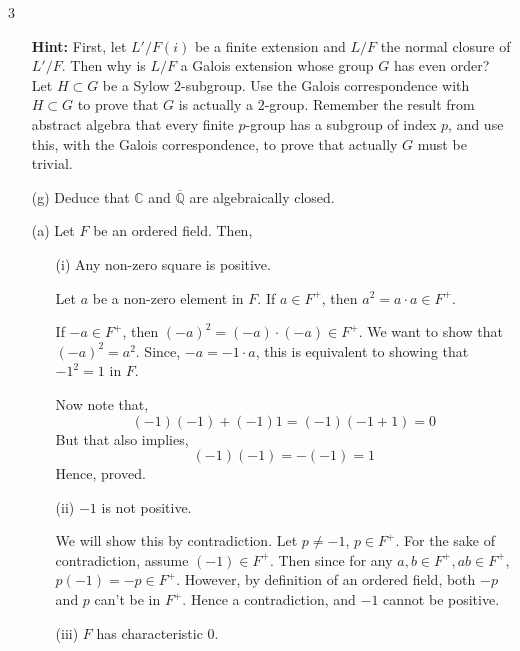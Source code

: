 \documentclass[12pt]{article}
\begin{document}
\begin{problem}{3}
\begin{enumerate}
\textbf{Hint:} First, let $L'/F(i)$ be a finite extension and $L/F$ the normal closure of $L'/F$. Then why is $L/F$ a Galois extension whose group $G$ has even order? Let $H \subset G$ be a Sylow $2$-subgroup. Use the Galois correspondence with $H \subset G$ to prove that $G$ is actually a $2$-group. Remember the result from abstract algebra that every finite $p$-group has a subgroup of index $p$, and use this, with the Galois correspondence, to prove that actually $G$ must be trivial.

\item[(g)] Deduce that $\mathbb{C}$ and $\overline{\mathbb{Q}}$ are algebraically closed.
\end{enumerate}
\end{problem}

\begin{solution}
    \bbni
    \begin{enumerate}
        \item [(a)] Let $F$ be an ordered field. Then,
        \begin{enumerate}
            \item [(i)] Any non-zero square is positive. 
            
            Let $a$ be a non-zero element in $F$. 
            If $a \in F^+$, then $a^2 = a \cdot a \in F^+$.  
            
            If $-a \in F^+$, then $(-a)^2 = (-a) \cdot (-a) \in F^+$. We want to show that $(-a)^2 = a^2$. Since, $-a = -1 \cdot a$, this is equivalent to showing that $-1^2 =1$ in $F$. 
            
            Now note that, 
            \[(-1)(-1) + (-1)1 = (-1)(-1+1) = 0\]
            But that also implies, 
            \[(-1)(-1) = -(-1) = 1\]
            Hence, proved. 

            \bbni 

            \item [(ii)] $-1$ is not positive. 
            
            We will show this by contradiction. Let $p \neq -1$, $p \in F^+$. 
            For the sake of contradiction, assume $(-1) \in F^+$. 
            Then since for any $a, b \in F^+, ab \in F^+$, $p (-1)  = -p \in F^+$. However, by definition of an ordered field, both $-p$ and $p$ can't be in $F^+$. Hence a contradiction, and $-1$ cannot be positive.  

            \bbni 

            \item [(iii)] $F$ has characteristic $0$. 
            

\end{enumerate}
\end{enumerate}
\end{solution}
\end{document}
